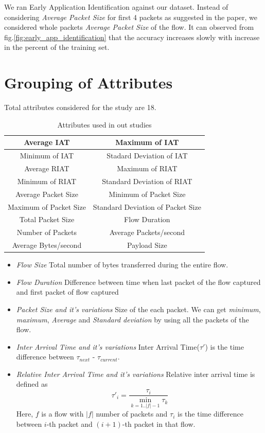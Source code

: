 \documentclass[conference]{IEEEtran}
\begin{document}
We ran Early Application Identification\cite{} against our dataset. Instead of considering \emph{Average Packet Size} for first 4 packets as suggested in the paper\cite{}, we considered whole packets \emph{Average Packet Size} of the flow. It can observed from fig.\ref{fig:early_app_identification} that the accuracy increases slowly with increase in the percent of the training set.  

\section{Grouping of Attributes}
Total attributes considered for the study are 18. 
\renewcommand{\arraystretch}{1.5}
\begin{table}
	\caption{Attributes used in out studies}
	\begin{tabular}{|c|c|}
		\hline  Average IAT & Maximum of IAT \\ [2pt]
		\hline  Minimum of IAT & Stadard Deviation of IAT\\ 
		\hline  Average RIAT & Maximum of RIAT\\ 
		\hline  Minimum of RIAT& Standard Deviation of RIAT\\
		\hline  Average Packet Size & Minimum of Packet Size \\  
		\hline  Maximum of Packet Size & Standard Deviation of Packet Size \\ 
		\hline  Total Packet Size& Flow Duration\\
		\hline  Number of Packets & Average Packets/second\\
		\hline  Average Bytes/second & Payload Size \\ 
		\hline 
	\end{tabular}
\end{table}
\vspace{5pt}
\begin{itemize} \itemsep3pt \parskip3pt 
	\item \emph{Flow Size}
	Total number of bytes transferred during the entire flow.
	\item \emph{Flow Duration}
	Difference between time when last packet of the flow captured and first packet of flow captured
	\item \emph{Packet Size and it's variations}
	Size of the each packet. We can get \emph{minimum}, \emph{maximum}, \emph{Average} and \emph{Standard deviation} by using all the packets of the flow.
	\item \emph{Inter Arrival Time and it's variations} 
	Inter Arrival Time($\tau'$)\cite{} is the time difference between $\tau_{next}$ - $\tau_{current}$.
	\item \emph{Relative Inter Arrival Time and it's variations} \cite{}
	Relative inter arrival time is defined as
	$$\tau'_i = \frac{\tau_i}{\displaystyle \min_{k=1..|f|-1}{\tau_k}}$$
	Here, $f$ is a flow with $|f|$ number of packets and $\tau_i$ is the time difference between $i$-th packet and $(i+1)$-th packet in that flow.\cite{} 
\end{itemize}
\end{document}
